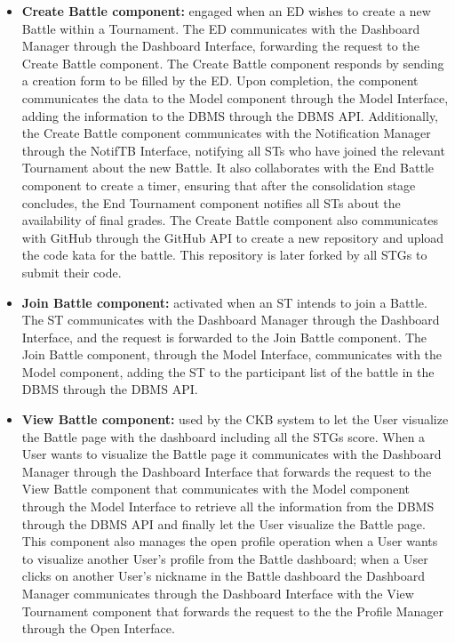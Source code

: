 \begin{itemize}
    \item \textbf{Create Battle component:} engaged when an ED wishes to create a new Battle within a Tournament. The ED communicates with the Dashboard Manager through the Dashboard Interface, forwarding the request to the Create Battle component. The Create Battle component responds by sending a creation form to be filled by the ED. Upon completion, the component communicates the data to the Model component through the Model Interface, adding the information to the DBMS through the DBMS API. Additionally, the Create Battle component communicates with the Notification Manager through the NotifTB Interface, notifying all STs who have joined the relevant Tournament about the new Battle. It also collaborates with the End Battle component to create a timer, ensuring that after the consolidation stage concludes, the End Tournament component notifies all STs about the availability of final grades. The Create Battle component also communicates with GitHub through the GitHub API to create a new repository and upload the code kata for the battle. This repository is later forked by all STGs to submit their code.
    \item \textbf{Join Battle component:} activated when an ST intends to join a Battle. The ST communicates with the Dashboard Manager through the Dashboard Interface, and the request is forwarded to the Join Battle component. The Join Battle component, through the Model Interface, communicates with the Model component, adding the ST to the participant list of the battle in the DBMS through the DBMS API.
    \item \textbf{View Battle component:} used by the CKB system to let the User visualize the Battle page with the dashboard including all the STGs score. When a User wants to visualize the  Battle page it communicates with the Dashboard Manager through the Dashboard Interface that forwards the request to the View Battle component that communicates with the Model component through the Model Interface to retrieve all the information from the DBMS through the DBMS API and finally let the User visualize the Battle page. This component also manages the open profile operation when a User wants to visualize another User’s profile from the Battle dashboard; when a User clicks on another User’s nickname in the Battle dashboard the Dashboard Manager communicates through the Dashboard Interface with the View Tournament component that forwards the request to the the Profile Manager through the Open Interface.

\end{itemize}
